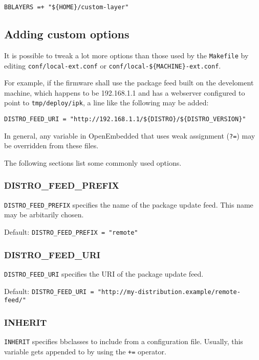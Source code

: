 \documentclass[a4paper]{article}
\newcommand{\shell}[1]{\texttt{\small #1}}
\begin{document}
     \shell{BBLAYERS =+ "\$\{HOME\}/custom-layer"}

  \subsection{Adding custom options}
     It is possible to tweak a lot more options than those used by the
     \shell{Makefile} by editing \shell{conf/local-ext.conf} or \shell{conf/local-\$\{MACHINE\}-ext.conf}.

     For example, if the firmware shall use the package feed built on the develoment machine, which
     happens to be 192.168.1.1 and has a webserver configured to point to \shell{tmp/deploy/ipk},
     a line like the following may be added:

     \shell{DISTRO\_FEED\_URI = "http://192.168.1.1/\$\{DISTRO\}/\$\{DISTRO\_VERSION\}"}

     In general, any variable in OpenEmbedded that uses weak assignment (\shell{?=}) may be
     overridden from these files.

     The following sections list some commonly used options.

     \subsubsection{DISTRO\_FEED\_PREFIX}

       \shell{DISTRO\_FEED\_PREFIX} specifies the name of the package update feed.
       This name may be arbitarily chosen.

       Default: \shell{DISTRO\_FEED\_PREFIX = "remote"}

     \subsubsection{DISTRO\_FEED\_URI}

       \shell{DISTRO\_FEED\_URI} specifies the URI of the package update feed.

       Default: \shell{DISTRO\_FEED\_URI = "http://my-distribution.example/remote-feed/"}

     \subsubsection{INHERIT}

       \shell{INHERIT} specifies bbclasses to include from a configuration file. Usually,
       this variable gets appended to by using the \shell{+=} operator.
\end{document}
